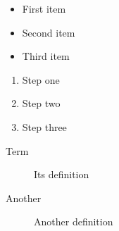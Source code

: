 \begin{itemize}
\tightlist
\item First item

\item Second item

\item Third item

\end{itemize}
\begin{enumerate}
\tightlist
\item Step one

\item Step two

\item Step three

\end{enumerate}
\begin{description}
\item[Term] Its definition

\item[Another] Another definition

\end{description}
